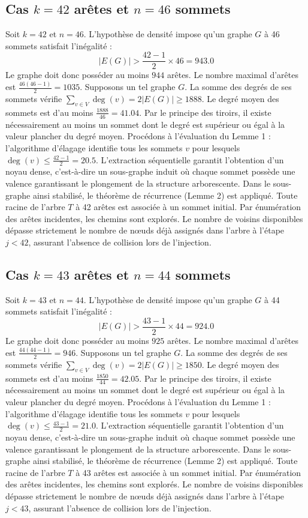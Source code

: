 \documentclass[12pt,a4paper]{article}
\begin{document}
\subsection{Cas $k = 42$ arêtes et $n = 46$ sommets}
Soit $k = 42$ et $n = 46$. L'hypothèse de densité impose qu'un graphe $G$ à 46 sommets satisfait l'inégalité :
$$ |E(G)| > \frac{42-1}{2} \times 46 = 943.0 $$
Le graphe doit donc posséder au moins $944$ arêtes. Le nombre maximal d'arêtes est $\frac{46(46-1)}{2} = 1035$.
Supposons un tel graphe $G$. La somme des degrés de ses sommets vérifie $\sum_{v \in V} \deg(v) = 2|E(G)| \geq 1888$.
Le degré moyen des sommets est d'au moins $\frac{1888}{46} = 41.04$.
Par le principe des tiroirs, il existe nécessairement au moins un sommet dont le degré est supérieur ou égal à la valeur plancher du degré moyen.
Procédons à l'évaluation du Lemme 1 : l'algorithme d'élagage identifie tous les sommets $v$ pour lesquels $\deg(v) \leq \frac{42-1}{2} = 20.5$.
L'extraction séquentielle garantit l'obtention d'un noyau dense, c'est-à-dire un sous-graphe induit où chaque sommet possède une valence garantissant le plongement de la structure arborescente.
Dans le sous-graphe ainsi stabilisé, le théorème de récurrence (Lemme 2) est appliqué. Toute racine de l'arbre $T$ à 42 arêtes est associée à un sommet initial. Par énumération des arêtes incidentes, les chemins sont explorés. Le nombre de voisins disponibles dépasse strictement le nombre de nœuds déjà assignés dans l'arbre à l'étape $j < 42$, assurant l'absence de collision lors de l'injection.

\subsection{Cas $k = 43$ arêtes et $n = 44$ sommets}
Soit $k = 43$ et $n = 44$. L'hypothèse de densité impose qu'un graphe $G$ à 44 sommets satisfait l'inégalité :
$$ |E(G)| > \frac{43-1}{2} \times 44 = 924.0 $$
Le graphe doit donc posséder au moins $925$ arêtes. Le nombre maximal d'arêtes est $\frac{44(44-1)}{2} = 946$.
Supposons un tel graphe $G$. La somme des degrés de ses sommets vérifie $\sum_{v \in V} \deg(v) = 2|E(G)| \geq 1850$.
Le degré moyen des sommets est d'au moins $\frac{1850}{44} = 42.05$.
Par le principe des tiroirs, il existe nécessairement au moins un sommet dont le degré est supérieur ou égal à la valeur plancher du degré moyen.
Procédons à l'évaluation du Lemme 1 : l'algorithme d'élagage identifie tous les sommets $v$ pour lesquels $\deg(v) \leq \frac{43-1}{2} = 21.0$.
L'extraction séquentielle garantit l'obtention d'un noyau dense, c'est-à-dire un sous-graphe induit où chaque sommet possède une valence garantissant le plongement de la structure arborescente.
Dans le sous-graphe ainsi stabilisé, le théorème de récurrence (Lemme 2) est appliqué. Toute racine de l'arbre $T$ à 43 arêtes est associée à un sommet initial. Par énumération des arêtes incidentes, les chemins sont explorés. Le nombre de voisins disponibles dépasse strictement le nombre de nœuds déjà assignés dans l'arbre à l'étape $j < 43$, assurant l'absence de collision lors de l'injection.
\end{document}

